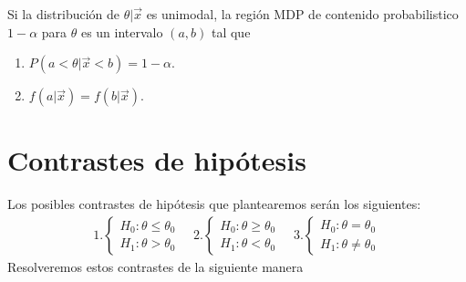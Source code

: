 \begin{obs}
    Si la distribución de $\theta | \vec{x}$ es unimodal, la región MDP de contenido probabilistico $1-\alpha$ para $\theta$ es un intervalo $(a,b)$ tal que
    \begin{enumerate}
        \item $P(a < \theta | \vec{x} < b) = 1 - \alpha$.
        \item $f(a | \vec{x}) = f(b | \vec{x})$.
    \end{enumerate}
\end{obs}

\section{Contrastes de hipótesis}
\noindent Los posibles contrastes de hipótesis que plantearemos serán los siguientes:
\begin{align*}
   1. \begin{cases}
        H_0 : \theta \leq \theta_0 \\
        H_1 : \theta > \theta_0
    \end{cases} \quad     2.\begin{cases}
        H_0 : \theta \ge \theta_0 \\
        H_1 : \theta < \theta_0
    \end{cases} \quad     3.\begin{cases}
        H_0 : \theta = \theta_0 \\
        H_1 : \theta \not = \theta_0
    \end{cases}
\end{align*}
Resolveremos estos contrastes de la siguiente manera
